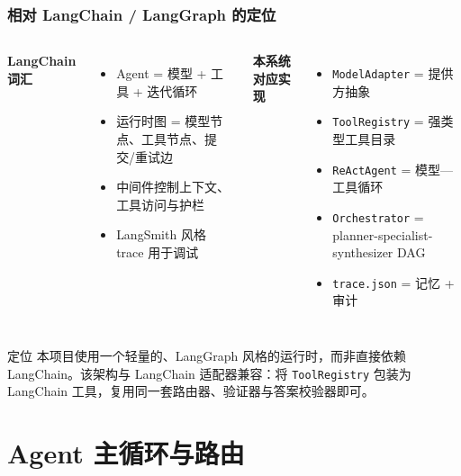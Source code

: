 \documentclass[11pt, aspectratio=169]{beamer}
\begin{document}
\begin{frame}
\frametitle{相对 LangChain / LangGraph 的定位}

\begin{columns}[T]
\textbf{LangChain 词汇}
\begin{itemize}
    \item Agent = 模型 + 工具 + 迭代循环
    \item 运行时图 = 模型节点、工具节点、提交/重试边
    \item 中间件控制上下文、工具访问与护栏
    \item LangSmith 风格 trace 用于调试
\end{itemize}

\textbf{本系统对应实现}
\begin{itemize}
    \item \texttt{ModelAdapter} = 提供方抽象
    \item \texttt{ToolRegistry} = 强类型工具目录
    \item \texttt{ReActAgent} = 模型—工具循环
    \item \texttt{Orchestrator} = planner-specialist-synthesizer DAG
    \item \texttt{trace.json} = 记忆 + 审计
\end{itemize}
\end{columns}

\vspace{0.4em}
\begin{block}{定位}
本项目使用一个轻量的、LangGraph 风格的运行时，而非直接依赖 LangChain。该架构与 LangChain 适配器兼容：将 \texttt{ToolRegistry} 包装为 LangChain 工具，复用同一套路由器、验证器与答案校验器即可。
\end{block}

\end{frame}

\section{Agent 主循环与路由}
\end{document}
